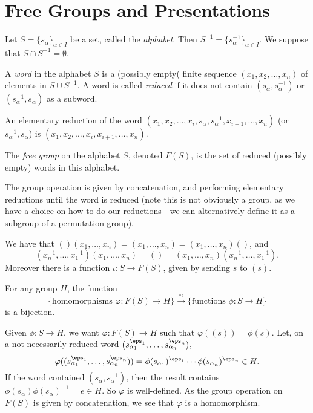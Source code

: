 \documentclass[12pt]{article}
\begin{document}
\newpage

\section{Free Groups and Presentations}
\label{sec:fg_pres}

Let $S = \{s_\alpha\}_{\alpha \in I}$ be a set, called the \emph{alphabet}. Then $S^{-1} = \{s_\alpha^{-1}\}_{\alpha \in I}$. We suppose that $S \cap S^{-1} = \emptyset$.

A \emph{word} in the alphabet $S$ is a (possibly empty( finite sequence $(x_1, x_2, \ldots, x_n)$ of elements in $S \cup S^{-1}$. A word is called \emph{reduced} if it does not contain $(s_\alpha, s_\alpha^{-1})$ or $(s_\alpha^{-1}, s_\alpha)$ as a subword.

An elementary reduction of the word $(x_1, x_2, \ldots, x_i, s_\alpha, s_\alpha^{-1}, x_{i+1}, \ldots, x_n)$ (or $s_\alpha^{-1}, s_\alpha$) is $(x_1, x_2, \ldots, x_i, x_{i+1}, \ldots, x_n)$.

\begin{definition}
	The \emph{free group} on the alphabet $S$, denoted $F(S)$, is the set of reduced (possibly empty) words in this alphabet.

	The group operation is given by concatenation, and performing elementary reductions until the word is reduced (note this is not obviously a group, as we have a choice on how to do our reductions---we can alternatively define it as a subgroup of a permutation group).

	We have that $()(x_1, \ldots, x_n) = (x_1, \ldots, x_n) = (x_1, \ldots, x_n)()$, and
	\[
		(x_n^{-1}, \ldots, x_1^{-1})(x_1, \ldots, x_n) = () = (x_1, \ldots, x_n)(x_n^{-1}, \ldots, x_1^{-1}).
	\]
	Moreover there is a function $\iota : S \to F(S)$, given by sending $s$ to $(s)$.
\end{definition}

\begin{lemma}
	For any group $H$, the function
	\[
		\{\text{homomorphisms } \varphi : F(S) \to H\} \overset{\circ \iota}{\to} \{\text{functions } \phi : S \to H\}
	\]
	is a bijection.
\end{lemma}

\begin{proofbox}
	Given $\phi : S \to H$, we want $\varphi : F(S) \to H$ such that $\varphi((s)) = \phi(s)$. Let, on a not necessarily reduced word $(s_{\alpha_1}^{\eps_1}, \ldots, s_{\alpha_n}^{\eps_n})$,
	\[
	\varphi((s_{\alpha_1}^{\eps_1}, \ldots, s_{\alpha_n}^{\eps_n})) = \phi(s_{\alpha_1})^{\eps_1} \cdots \phi(s_{\alpha_n})^{\eps_n} \in H.
	\]
	If the word contained $(s_\alpha, s_\alpha^{-1})$, then the result contains $\phi(s_\alpha) \phi(s_\alpha)^{-1} = e \in H$. So $\varphi$ is well-defined. As the group operation on $F(S)$ is given by concatenation, we see that $\varphi$ is a homomorphism.
\end{proofbox}
\end{document}
